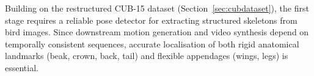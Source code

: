 \documentclass[final-report]{report-template}
\begin{document}








Building on the restructured CUB-15 dataset (Section~\ref{sec:cubdataset}), the first stage requires a reliable pose detector for extracting structured skeletons from bird images. Since downstream motion generation and video synthesis depend on temporally consistent sequences, accurate localisation of both rigid anatomical landmarks (beak, crown, back, tail) and flexible appendages (wings, legs) is essential.  
\end{document}
